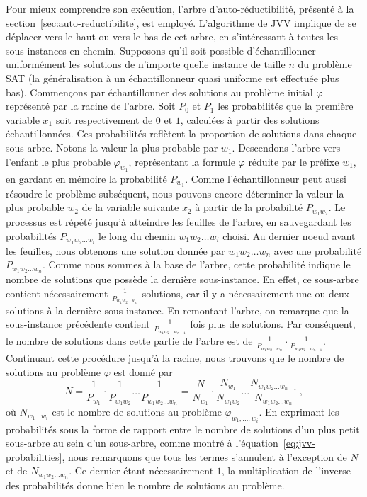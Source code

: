 Pour mieux comprendre son exécution, l'arbre d'auto-réductibilité, présenté à la section~\ref{sec:auto-reductibilite}, est employé. L'algorithme de JVV implique de se déplacer vers le haut ou vers le bas de cet arbre, en s'intéressant à toutes les sous-instances en chemin. Supposons qu'il soit possible d'échantillonner uniformément les solutions de n'importe quelle instance de taille $n$ du problème SAT (la généralisation à un échantillonneur quasi uniforme est effectuée plus bas). Commençons par échantillonner des solutions au problème initial $\varphi$ représenté par la racine de l'arbre. Soit $P_{0}$ et $P_{1}$ les probabilités que la première variable $x_{1}$ soit respectivement de $0$ et $1$, calculées à partir des solutions échantillonnées. Ces probabilités reflètent la proportion de solutions dans chaque sous-arbre. Notons la valeur la plus probable par $w_{1}$. Descendons l'arbre vers l'enfant le plus probable $\varphi_{w_{1}}$, représentant la formule $\varphi$ réduite par le préfixe $w_{1}$, en gardant en mémoire la probabilité $P_{w_{1}}$. Comme l'échantillonneur peut aussi résoudre le problème subséquent, nous pouvons encore déterminer la valeur la plus probable $w_{2}$ de la variable suivante $x_{2}$ à partir de la probabilité $P_{w_{1}w_{2}}$. Le processus est répété jusqu'à atteindre les feuilles de l'arbre, en sauvegardant les probabilités $P_{w_{1} w_{2} \dots w_{i}}$ le long du chemin $w_{1} w_{2} \dots w_{i}$ choisi. Au dernier noeud avant les feuilles, nous obtenons une solution donnée par $w_{1} w_{2} \dots w_{n}$ avec une probabilité $P_{w_{1} w_{2} \dots w_{n}}$. Comme nous sommes à la base de l'arbre, cette probabilité indique le nombre de solutions que possède la dernière sous-instance. En effet, ce sous-arbre contient nécessairement $\frac{1}{P_{w_{1} w_{2} \dots w_{n}}}$ solutions, car il y a nécessairement une ou deux solutions à la dernière sous-instance. En remontant l'arbre, on remarque que la sous-instance précédente contient $\frac{1}{P_{w_{1} w_{2} \dots w_{n-1}}}$ fois plus de solutions. Par conséquent, le nombre de solutions dans cette partie de l'arbre est de $\frac{1}{P_{w_{1} w_{2} \dots w_{n}}} \cdot \frac{1}{P_{w_{1} w_{2} \dots w_{n-1}}}$. Continuant cette procédure jusqu'à la racine, nous trouvons que le nombre de solutions au problème $\varphi$ est donné par 
\begin{equation}
    \label{eq:jvv-probabilities}
    N = \frac{1}{P_{w_{1}}} \cdot \frac{1}{P_{w_{1} w_{2}}} \dots \frac{1}{P_{w_{1} w_{2} \dots w_{n}}} = \frac{N}{N_{w_{1}}} \cdot \frac{N_{w_{1}}}{N_{w_{1} w_{2}}} \dots \frac{N_{w_{1} w_{2} \dots w_{n-1}}}{N_{w_{1} w_{2} \dots w_{n}}} \,,
\end{equation}
où $N_{w_{1} \dots w_{i}}$ est le nombre de solutions au problème $\varphi_{w_{1}, \dots, w_{i}}$. En exprimant les probabilités sous la forme de rapport entre le nombre de solutions d'un plus petit sous-arbre au sein d'un sous-arbre, comme montré à l'équation~\ref{eq:jvv-probabilities}, nous remarquons que tous les termes s'annulent à l'exception de $N$ et de $N_{w_{1}w_{2}\dots w_{n}}$. Ce dernier étant nécessairement $1$, la multiplication de l'inverse des probabilités donne bien le nombre de solutions au problème.


